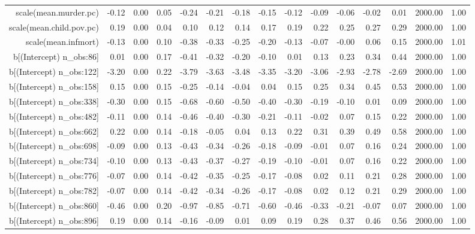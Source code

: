 \begin{table}[ht]
\begin{tabular}{rrrrrrrrrrrrrrr}
  scale(mean.murder.pc) & -0.12 & 0.00 & 0.05 & -0.24 & -0.21 & -0.18 & -0.15 & -0.12 & -0.09 & -0.06 & -0.02 & 0.01 & 2000.00 & 1.00 \\ 
  scale(mean.child.pov.pc) & 0.19 & 0.00 & 0.04 & 0.10 & 0.12 & 0.14 & 0.17 & 0.19 & 0.22 & 0.25 & 0.27 & 0.29 & 2000.00 & 1.00 \\ 
  scale(mean.infmort) & -0.13 & 0.00 & 0.10 & -0.38 & -0.33 & -0.25 & -0.20 & -0.13 & -0.07 & -0.00 & 0.06 & 0.15 & 2000.00 & 1.01 \\ 
  b[(Intercept) n\_obs:86] & 0.01 & 0.00 & 0.17 & -0.41 & -0.32 & -0.20 & -0.10 & 0.01 & 0.13 & 0.23 & 0.34 & 0.44 & 2000.00 & 1.00 \\ 
  b[(Intercept) n\_obs:122] & -3.20 & 0.00 & 0.22 & -3.79 & -3.63 & -3.48 & -3.35 & -3.20 & -3.06 & -2.93 & -2.78 & -2.69 & 2000.00 & 1.00 \\ 
  b[(Intercept) n\_obs:158] & 0.15 & 0.00 & 0.15 & -0.25 & -0.14 & -0.04 & 0.04 & 0.15 & 0.25 & 0.34 & 0.45 & 0.53 & 2000.00 & 1.00 \\ 
  b[(Intercept) n\_obs:338] & -0.30 & 0.00 & 0.15 & -0.68 & -0.60 & -0.50 & -0.40 & -0.30 & -0.19 & -0.10 & 0.01 & 0.09 & 2000.00 & 1.00 \\ 
  b[(Intercept) n\_obs:482] & -0.11 & 0.00 & 0.14 & -0.46 & -0.40 & -0.30 & -0.21 & -0.11 & -0.02 & 0.07 & 0.15 & 0.22 & 2000.00 & 1.00 \\ 
  b[(Intercept) n\_obs:662] & 0.22 & 0.00 & 0.14 & -0.18 & -0.05 & 0.04 & 0.13 & 0.22 & 0.31 & 0.39 & 0.49 & 0.58 & 2000.00 & 1.00 \\ 
  b[(Intercept) n\_obs:698] & -0.09 & 0.00 & 0.13 & -0.43 & -0.34 & -0.26 & -0.18 & -0.09 & -0.01 & 0.07 & 0.16 & 0.24 & 2000.00 & 1.00 \\ 
  b[(Intercept) n\_obs:734] & -0.10 & 0.00 & 0.13 & -0.43 & -0.37 & -0.27 & -0.19 & -0.10 & -0.01 & 0.07 & 0.16 & 0.22 & 2000.00 & 1.00 \\ 
  b[(Intercept) n\_obs:776] & -0.07 & 0.00 & 0.14 & -0.42 & -0.35 & -0.25 & -0.17 & -0.08 & 0.02 & 0.11 & 0.21 & 0.28 & 2000.00 & 1.00 \\ 
  b[(Intercept) n\_obs:782] & -0.07 & 0.00 & 0.14 & -0.42 & -0.34 & -0.26 & -0.17 & -0.08 & 0.02 & 0.12 & 0.21 & 0.29 & 2000.00 & 1.00 \\ 
  b[(Intercept) n\_obs:860] & -0.46 & 0.00 & 0.20 & -0.97 & -0.85 & -0.71 & -0.60 & -0.46 & -0.33 & -0.21 & -0.07 & 0.07 & 2000.00 & 1.00 \\ 
  b[(Intercept) n\_obs:896] & 0.19 & 0.00 & 0.14 & -0.16 & -0.09 & 0.01 & 0.09 & 0.19 & 0.28 & 0.37 & 0.46 & 0.56 & 2000.00 & 1.00 \\ 

\end{tabular}
\end{table}

